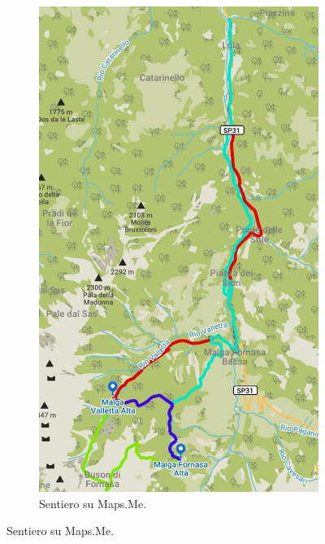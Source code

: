 \documentclass{article}
\begin{document}
\begin{figure}[htbp!]
    \centering
    \begin{subfigure}[t]{0.45\textwidth}
        \centering
        \vspace{0pt} %
        \includegraphics[width=\textwidth]{images/sentiero_mapsMe_Giro1.jpg}
        \caption{Sentiero su Maps.Me.}
        \label{fig:foto_lunga}
    \end{subfigure}
    \hfill

\end{figure}
\end{document}
